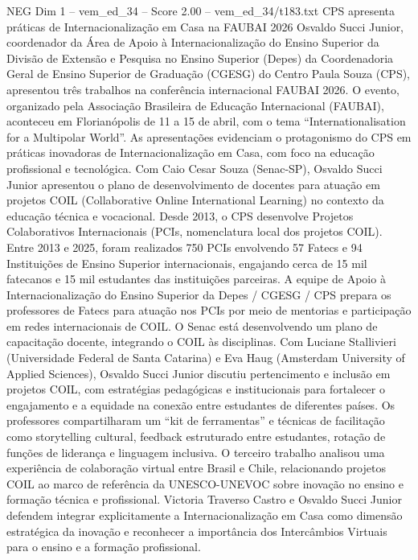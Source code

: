 \begin{textsample}{NEG Dim 1 – vem\_ed\_34 – Score 2.00 – vem\_ed\_34/t183.txt}  \label{ex:f1_neg_031}
CPS apresenta práticas de Internacionalização em Casa na FAUBAI 2026 Osvaldo Succi Junior, coordenador da Área de Apoio à Internacionalização do Ensino Superior da Divisão de Extensão e Pesquisa no Ensino Superior (Depes) da Coordenadoria Geral de Ensino Superior de Graduação (CGESG) do Centro Paula Souza (CPS), apresentou três trabalhos na conferência internacional FAUBAI 2026.
O evento, organizado pela Associação Brasileira de Educação Internacional (FAUBAI), aconteceu em Florianópolis de 11 a 15 de abril, com o tema “Internationalisation for a Multipolar World”.
As apresentações evidenciam o protagonismo do CPS em práticas inovadoras de Internacionalização em Casa, com foco na educação profissional e tecnológica.
Com Caio Cesar Souza (Senac-SP), Osvaldo Succi Junior apresentou o plano de desenvolvimento de docentes para atuação em projetos COIL (Collaborative Online International Learning) no contexto da educação técnica e vocacional.
Desde 2013, o CPS desenvolve Projetos Colaborativos Internacionais (PCIs, nomenclatura local dos projetos COIL).
Entre 2013 e 2025, foram realizados 750 PCIs envolvendo 57 Fatecs e 94 Instituições de Ensino Superior internacionais, engajando cerca de 15 mil fatecanos e 15 mil estudantes das instituições parceiras.
A equipe de Apoio à Internacionalização do Ensino Superior da Depes / CGESG / CPS prepara os professores de Fatecs para atuação nos PCIs por meio de mentorias e participação em redes internacionais de COIL.
O Senac está desenvolvendo um plano de capacitação docente, integrando o COIL às disciplinas.
Com Luciane Stallivieri (Universidade Federal de Santa Catarina) e Eva Haug (Amsterdam University of Applied Sciences), Osvaldo Succi Junior discutiu pertencimento e inclusão em projetos COIL, com estratégias pedagógicas e institucionais para fortalecer o engajamento e a equidade na conexão entre estudantes de diferentes países.
Os professores compartilharam um “kit de ferramentas” e técnicas de facilitação como storytelling cultural, feedback estruturado entre estudantes, rotação de funções de liderança e linguagem inclusiva.
O terceiro trabalho analisou uma experiência de colaboração virtual entre Brasil e Chile, relacionando projetos COIL ao marco de referência da UNESCO-UNEVOC sobre inovação no ensino e formação técnica e profissional.
Victoria Traverso Castro e Osvaldo Succi Junior defendem integrar explicitamente a Internacionalização em Casa como dimensão estratégica da inovação e reconhecer a importância dos Intercâmbios Virtuais para o ensino e a formação profissional.

\end{textsample}
